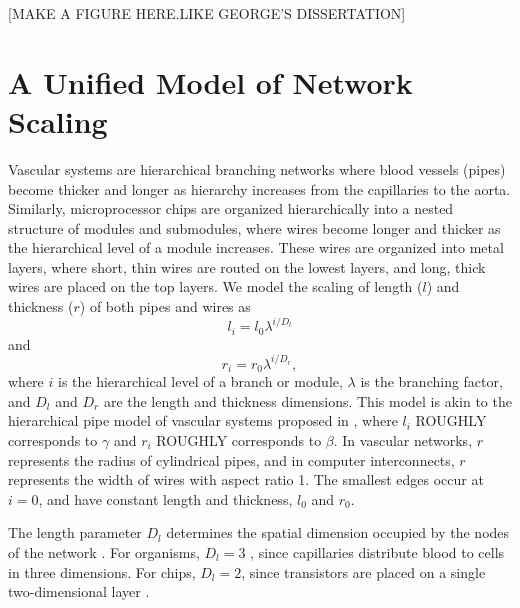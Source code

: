 \documentclass[12pt]{article}
\begin{document}
[MAKE A FIGURE HERE.LIKE GEORGE'S DISSERTATION]

\section{A Unified Model of Network Scaling}
\label{sec:unified-model}


Vascular systems are hierarchical branching networks where blood 
vessels (pipes) become thicker and longer as hierarchy increases from 
the capillaries to the aorta. Similarly, microprocessor chips are 
organized hierarchically into a nested structure of modules and 
submodules, where wires become longer and thicker as the hierarchical 
level of a module increases.  These wires are organized into metal 
layers, where short, thin wires are routed on the lowest layers, and 
long, thick wires are placed on the top layers. We model the scaling 
of length ($l$) and thickness ($r$) of both pipes and wires as
\begin{equation}
l_i = l_0 \lambda^{i/D_l}
\end{equation}
and
\begin{equation}
r_i = r_0 \lambda^{i/D_r},
\end{equation}
where $i$ is the hierarchical level of a branch or module, $\lambda$ 
is the branching factor, and $D_l$ and $D_r$ are the length and 
thickness dimensions.  This model is akin to the hierarchical pipe 
model of vascular systems proposed in \cite{west97}, where $l_i$ 
ROUGHLY corresponds to $\gamma$ and $r_i$ ROUGHLY corresponds to $\beta$.  In vascular 
networks, $r$ represents the radius of cylindrical pipes, and in 
computer interconnects, $r$ represents the width of wires with aspect 
ratio 1.  The smallest edges occur at $i = 0$, and have constant 
length and thickness, $l_0$ and $r_0$. 

The length parameter $D_l$ determines the spatial dimension occupied 
by the nodes of the network \cite{mandelbrot83}.
For organisms, $D_l = 3$ 
\cite{west97}, since capillaries distribute blood to cells in three 
dimensions.  For chips, $D_l = 2$, since transistors are placed on a 
single two-dimensional layer \cite{donath81}.
\end{document}
